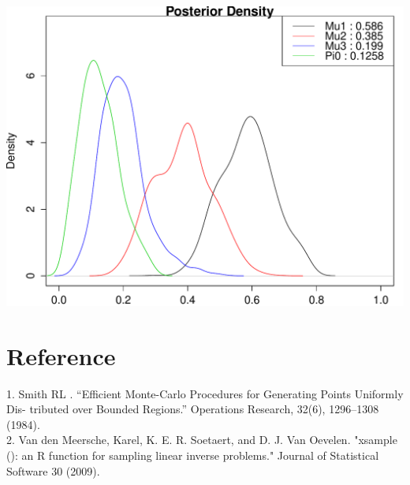\documentclass[11 pt, a4paper]{article}  %
\begin{document}
\begin{center}
\includegraphics[scale=0.65]{post_k3.pdf}
\end{center}




%


\newpage
\section*{Reference}
1. Smith RL . “Efficient Monte-Carlo Procedures for Generating Points Uniformly Dis- tributed over Bounded Regions.” Operations Research, 32(6), 1296–1308 (1984).\\ 
2. Van den Meersche, Karel, K. E. R. Soetaert, and D. J. Van Oevelen. "xsample (): an R function for sampling linear inverse problems." Journal of Statistical Software 30 (2009).
\end{document}
